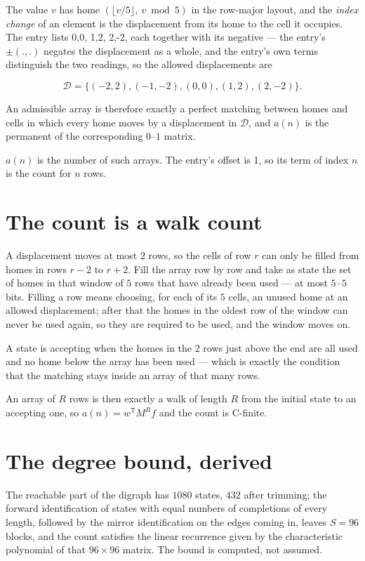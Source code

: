 \documentclass[11pt]{article}
\theoremstyle{definition}
\begin{document}
The value $v$ has home $(\lfloor v/5\rfloor,\ v \bmod 5)$ in the row-major layout, and the {\itshape index change} of an element is the displacement from its home to the cell it occupies. The entry lists 0,0, 1,2, 2,-2, each together with its negative --- the entry's $\pm(.,.)$ negates the displacement as a whole, and the entry's own terms distinguish the two readings, so the allowed displacements are

\[\mathcal{D} = \{(-2,2), (-1,-2), (0,0), (1,2), (2,-2)\}.\]

An admissible array is therefore exactly a perfect matching between homes and cells in which every home moves by a displacement in $\mathcal{D}$, and $a(n)$ is the permanent of the corresponding $0$--$1$ matrix.

$a(n)$ is the number of such arrays. The entry's offset is 1, so its term of index $n$ is the count for $n$ rows.

\section{The count is a walk count}

A displacement moves at most $2$ rows, so the cells of row $r$ can only be filled from homes in rows $r-2$ to $r+2$. Fill the array row by row and take as state the set of homes in that window of $5$ rows that have already been used --- at most $5\cdot5$ bits. Filling a row means choosing, for each of its $5$ cells, an unused home at an allowed displacement; after that the homes in the oldest row of the window can never be used again, so they are required to be used, and the window moves on.

A state is accepting when the homes in the $2$ rows just above the end are all used and no home below the array has been used --- which is exactly the condition that the matching stays inside an array of that many rows.

An array of $R$ rows is then exactly a walk of length $R$ from the initial state to an accepting one, so $a(n) = w^{\mathsf T}M^{R}f$ and the count is C-finite.

\section{The degree bound, derived}

The reachable part of the digraph has $1080$ states, $432$ after trimming; the forward identification of states with equal numbers of completions of every length, followed by the mirror identification on the edges coming in, leaves $S = 96$ blocks, and the count satisfies the linear recurrence given by the characteristic polynomial of that $96\times96$ matrix. The bound is computed, not assumed.
\end{document}
